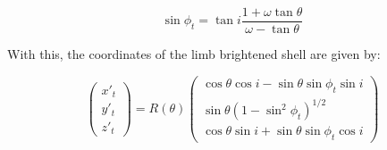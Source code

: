 \begin{equation}
\sin\phi_t = \tan i \frac{1+\omega\tan\theta}{\omega-\tan\theta}
\end{equation}

With this, the coordinates of the limb brightened shell are given by:

\begin{equation}
\left(\begin{array}{c}
x'_t \\ y'_t \\ z'_t
\end{array}\right)= R(\theta)\left(\begin{array}{c}
\cos\theta\cos i - \sin\theta\sin\phi_t \sin i \\
\sin\theta(1-\sin^2\phi_t)^{1/2} \\
\cos\theta\sin i +\sin\theta\sin\phi_t\cos i
\end{array}\right)
\end{equation} 
